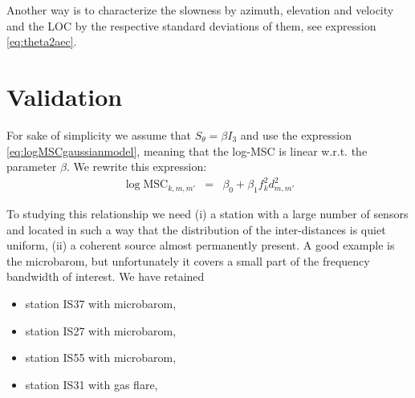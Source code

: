 \documentclass[a4paper, 12pt]{report}
\def\MSC{\mathrm{MSC}}
\begin{document}
Another way is to characterize the slowness by azimuth, elevation and velocity and the LOC by the respective standard deviations of them, see expression \eqref{eq:theta2aec}.
 \section{Validation}
For sake of simplicity we assume that $S_{\theta}=\beta I_{3}$ and use the expression \eqref{eq:logMSCgaussianmodel}, meaning that the log-MSC is linear w.r.t. the parameter $\beta$. We rewrite this expression:
\begin{eqnarray*}
 \log \MSC_{k,m,m'}&=& \beta_{0}+\beta_{1} f_{k}^2 d_{m,m'}^{2}
\end{eqnarray*}

To studying this relationship we need (i) a  station with a large number of sensors and located in such a way that the distribution of the inter-distances is quiet  uniform, (ii) a coherent source almost permanently present. A good example is the microbarom, but unfortunately it covers a small part of the frequency bandwidth of interest. We have retained
\begin{itemize}
\item
station IS37 with microbarom,
\item
station IS27 with microbarom,
\item
station IS55 with microbarom,
\item
station IS31 with gas flare,
\end{itemize}


\end{document}

